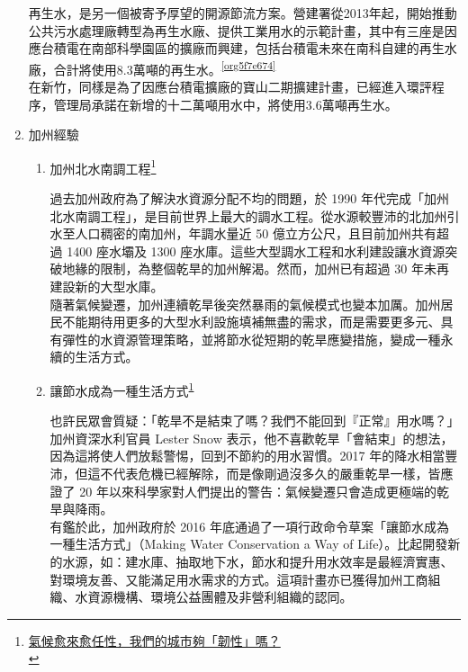 \documentclass[a4paper,12pt]{article}
\begin{document}
\begin{enumerate}
再生水，是另一個被寄予厚望的開源節流方案。營建署從2013年起，開始推動公共污水處理廠轉型為再生水廠、提供工業用水的示範計畫，其中有三座是因應台積電在南部科學園區的擴廠而興建，包括台積電未來在南科自建的再生水廠，合計將使用8.3萬噸的再生水。\textsuperscript{\ref{org5f7e674}}\\

在新竹，同樣是為了因應台積電擴廠的寶山二期擴建計畫，已經進入環評程序，管理局承諾在新增的十二萬噸用水中，將使用3.6萬噸再生水。\\

\item 加州經驗
\label{sec:org359b8ec}

\begin{enumerate}
\item 加州北水南調工程\footnote{\href{https://www.seinsights.asia/specialfeature/5065/5094}{氣候愈來愈任性，我們的城市夠「韌性」嗎？}\\\label{org7e1098b}}
\label{sec:orgc1c4f80}

過去加州政府為了解決水資源分配不均的問題，於 1990 年代完成「加州北水南調工程」，是目前世界上最大的調水工程。從水源較豐沛的北加州引水至人口稠密的南加州，年調水量近 50 億立方公尺，且目前加州共有超過 1400 座水壩及 1300 座水庫。這些大型調水工程和水利建設讓水資源突破地緣的限制，為整個乾旱的加州解渴。然而，加州已有超過 30 年未再建設新的大型水庫。\\

隨著氣候變遷，加州連續乾旱後突然暴雨的氣候模式也變本加厲。加州居民不能期待用更多的大型水利設施填補無盡的需求，而是需要更多元、具有彈性的水資源管理策略，並將節水從短期的乾旱應變措施，變成一種永續的生活方式。\\

\item 讓節水成為一種生活方式\textsuperscript{\ref{org7e1098b}}
\label{sec:org4c6b2ce}

也許民眾會質疑：「乾旱不是結束了嗎？我們不能回到『正常』用水嗎？」加州資深水利官員 Lester Snow 表示，他不喜歡乾旱「會結束」的想法，因為這將使人們放鬆警惕，回到不節約的用水習慣。2017 年的降水相當豐沛，但這不代表危機已經解除，而是像剛過沒多久的嚴重乾旱一樣，皆應證了 20 年以來科學家對人們提出的警告：氣候變遷只會造成更極端的乾旱與降雨。\\

有鑑於此，加州政府於 2016 年底通過了一項行政命令草案「讓節水成為一種生活方式」（Making Water Conservation a Way of Life）。比起開發新的水源，如：建水庫、抽取地下水，節水和提升用水效率是最經濟實惠、對環境友善、又能滿足用水需求的方式。這項計畫亦已獲得加州工商組織、水資源機構、環境公益團體及非營利組織的認同。\\


\end{enumerate}
\end{enumerate}
\end{document}

